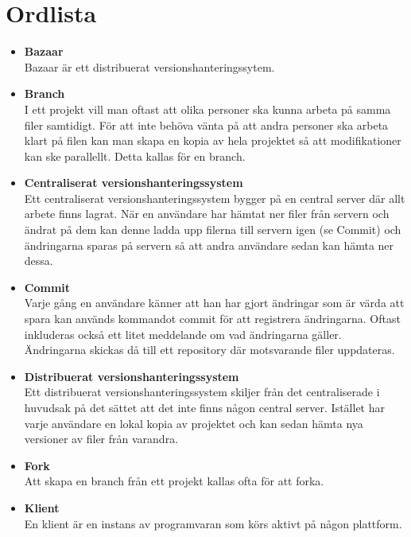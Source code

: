 \section{Ordlista}
\begin{itemize}
	\item \textbf{Bazaar}
	\\Bazaar är ett distribuerat versionshanteringssytem.
	
	\item \textbf{Branch}
	\\I ett projekt vill man oftast att olika personer ska kunna arbeta på samma filer samtidigt. För att inte behöva vänta på att andra personer ska arbeta klart på filen kan man skapa en kopia av hela projektet så att modifikationer kan ske parallellt. Detta kallas för en branch.
	
	\item \textbf{Centraliserat versionshanteringssystem}
	\\Ett centraliserat versionshanteringssystem bygger på en central server där allt arbete finns lagrat. När en användare har hämtat ner filer från servern och ändrat på dem kan denne ladda upp filerna till servern igen (se Commit) och ändringarna sparas på servern så att andra användare sedan kan hämta ner dessa.
	
	\item \textbf{Commit}
	\\Varje gång en användare känner att han har gjort ändringar som är värda att spara kan används kommandot commit för att registrera ändringarna. Oftast inkluderas också ett litet meddelande om vad ändringarna gäller. Ändringarna skickas då till ett repository där motsvarande filer uppdateras.
	
	\item \textbf{Distribuerat versionshanteringssystem}
	\\Ett distribuerat versionshanteringssystem skiljer från det centraliserade i huvudsak på det sättet att det inte finns någon central server. Istället har varje användare en lokal kopia av projektet och kan sedan hämta nya versioner av filer från varandra.
	
	\item \textbf{Fork}
	\\Att skapa en branch från ett projekt kallas ofta för att forka.
	
	\item \textbf{Klient}
	\\En klient är en instans av programvaran som körs aktivt på någon
plattform.	
	

\end{itemize}

